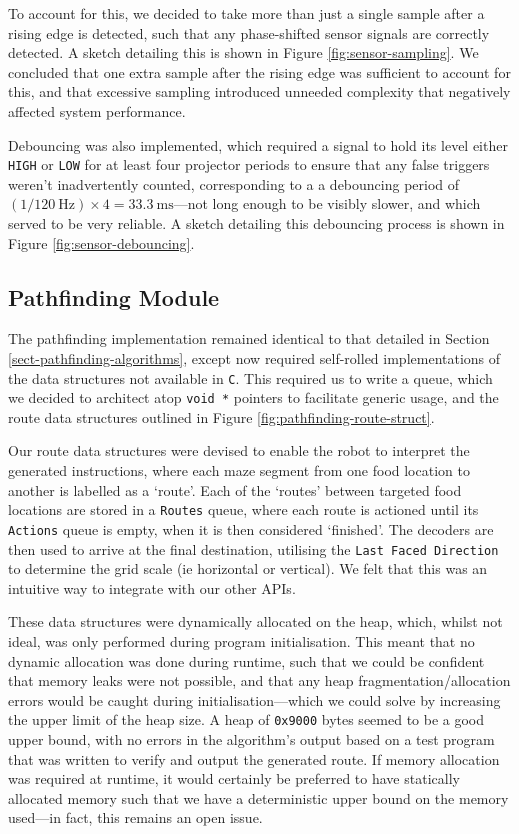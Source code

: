 \documentclass[conference]{IEEEtran}
\begin{document}
To account for this, we decided to take more than just a single sample after a rising edge is detected, such that any phase-shifted sensor signals are correctly detected.
A sketch detailing this is shown in Figure \ref{fig:sensor-sampling}.
We concluded that one extra sample after the rising edge was sufficient to account for this, and that excessive sampling introduced unneeded complexity that negatively affected system performance.

Debouncing was also implemented, which required a signal to hold its level either \texttt{HIGH} or \texttt{LOW} for at least four projector periods to ensure that any false triggers weren't inadvertently counted, corresponding to a a debouncing period of $\left(1 / \qty{120}{\hertz}\right) \times 4 = \qty{33.3}{\ms}$—not long enough to be visibly slower, and which served to be very reliable.
A sketch detailing this debouncing process is shown in Figure \ref{fig:sensor-debouncing}.

\subsection{Pathfinding Module}

The pathfinding implementation remained identical to that detailed in Section \ref{sect-pathfinding-algorithms}, except now required self-rolled implementations of the data structures not available in \texttt{C}.
This required us to write a queue, which we decided to architect atop \texttt{void *} pointers to facilitate generic usage, and the route data structures outlined in Figure \ref{fig:pathfinding-route-struct}.

Our route data structures were devised to enable the robot to interpret the generated instructions, where each maze segment from one food location to another is labelled as a `route'.
Each of the `routes' between targeted food locations are stored in a \texttt{Routes} queue, where each route is actioned until its \texttt{Actions} queue is empty, when it is then considered `finished'.
The decoders are then used to arrive at the final destination, utilising the \texttt{Last Faced Direction} to determine the grid scale (ie horizontal or vertical).
We felt that this was an intuitive way to integrate with our other APIs.

These data structures were dynamically allocated on the heap, which, whilst not ideal, was only performed during program initialisation.
This meant that no dynamic allocation was done during runtime, such that we could be confident that memory leaks were not possible, and that any heap fragmentation/allocation errors would be caught during initialisation—which we could solve by increasing the upper limit of the heap size.
A heap of \texttt{0x9000} bytes seemed to be a good upper bound, with no errors in the algorithm's output based on a test program that was written to verify and output the generated route.
If memory allocation was required at runtime, it would certainly be preferred to have statically allocated memory such that we have a deterministic upper bound on the memory used—in fact, this remains an open issue.
\end{document}
